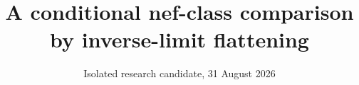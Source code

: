 \documentclass[11pt]{article}
\begin{document}
\title{A conditional nef-class comparison by inverse-limit flattening}
\author{}
\date{Isolated research candidate, 31 August 2026}
\maketitle





\end{document}
